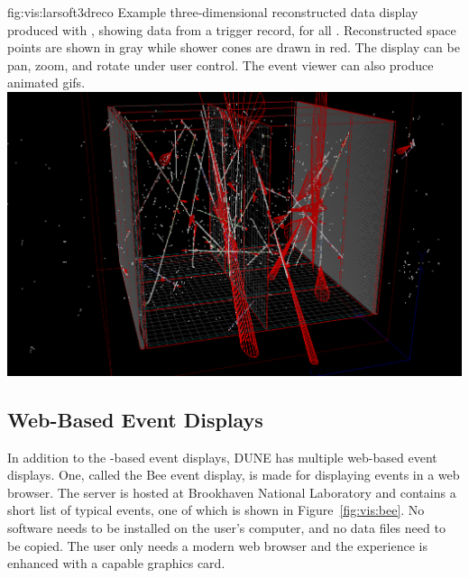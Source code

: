 \documentclass[../main-v1.tex]{subfiles}
\begin{document}
\begin{dunefigure}
{fig:vis:larsoft3dreco} 
{Example three-dimensional reconstructed data display produced with , showing data from a  trigger record, for all .  Reconstructed space points are shown in gray while shower cones are drawn in red.  The display can be pan, zoom, and rotate under user control.  The  \threed event viewer can also produce animated gifs.}
\includegraphics[width=0.8 \textwidth]{graphics/EventDisplays/larsoft_reco_evd_3d.png}
\end{dunefigure}

\subsection{Web-Based Event Displays}
\label{sec:visualization:web}

In addition to the -based event displays, DUNE has multiple web-based event displays.  One, called the Bee event display, is made for displaying  events in a web browser.  The server is hosted at Brookhaven National Laboratory and contains a short list of typical  events, one of which is shown in Figure~\ref{fig:vis:bee}. No software needs to be installed on the user's computer, and no data files need to be copied.  The user only needs a modern web browser and the experience is enhanced with a capable graphics card.
\end{document}
